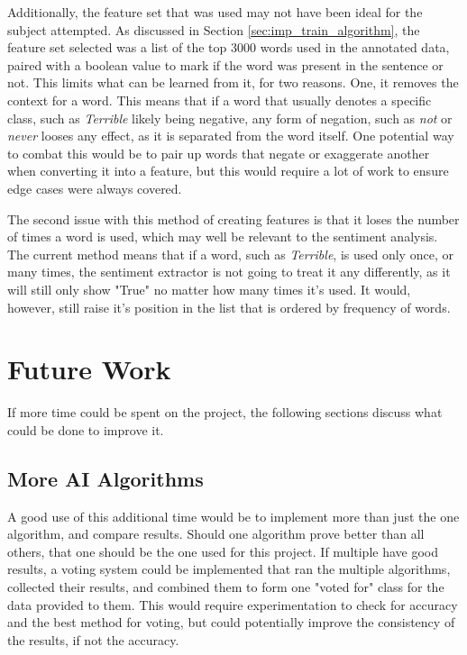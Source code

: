 Additionally, the feature set that was used may not have been ideal for the subject attempted. As discussed in Section \ref{sec:imp_train_algorithm}, the feature set selected was a list of the top 3000 words used in the annotated data, paired with a boolean value to mark if the word was present in the sentence or not. This limits what can be learned from it, for two reasons. One, it removes the context for a word. This means that if a word that usually denotes a specific class, such as \emph{Terrible} likely being negative, any form of negation, such as \emph{not} or \emph{never} looses any effect, as it is separated from the word itself. One potential way to combat this would be to pair up words that negate or exaggerate another when converting it into a feature, but this would require a lot of work to ensure edge cases were always covered.

The second issue with this method of creating features is that it loses the number of times a word is used, which may well be relevant to the sentiment analysis. The current method means that if a word, such as \emph{Terrible}, is used only once, or many times, the sentiment extractor is not going to treat it any differently, as it will still only show "True" no matter how many times it's used. It would, however, still raise it's position in the list that is ordered by frequency of words. 
\section{Future Work}

If more time could be spent on the project, the following sections discuss what could be done to improve it.

\subsection{More AI Algorithms}

A good use of this additional time would be to implement more than just the one algorithm, and compare results. Should one algorithm prove better than all others, that one should be the one used for this project. If multiple have good results, a voting system could be implemented that ran the multiple algorithms, collected their results, and combined them to form one "voted for" class for the data provided to them. This would require experimentation to check for accuracy and the best method for voting, but could potentially improve the consistency of the results, if not the accuracy.

